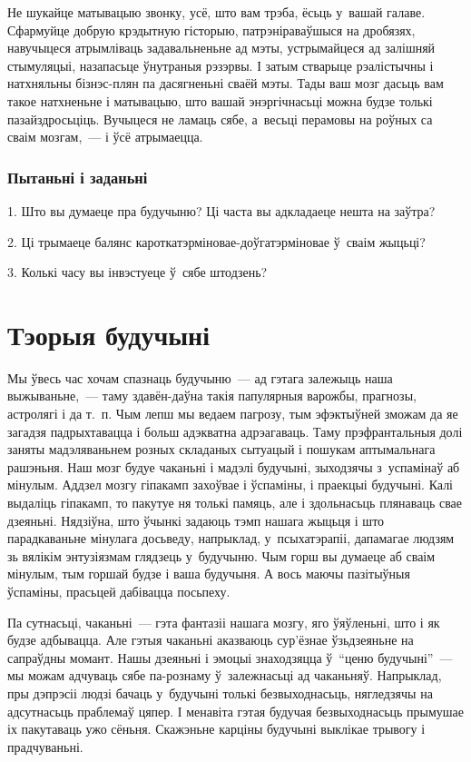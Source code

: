 Не шукайце матывацыю звонку, усё, што вам трэба, ёсьць у~вашай галаве. Сфармуйце добрую крэдытную гісторыю, патрэніраваўшыся на дробязях, навучыцеся атрымліваць задавальненьне ад мэты, устрымайцеся ад залішняй стымуляцыі, назапасьце ўнутраныя рэзэрвы. І затым стварыце рэалістычны і натхняльны бізнэс-плян па дасягненьні сваёй мэты. Тады ваш мозг дасьць вам такое натхненьне і матывацыю, што вашай энэргічнасьці можна будзе толькі пазайздросьціць. Вучыцеся не ламаць сябе, а~весьці перамовы на роўных са сваім мозгам,~--- і ўсё атрымаецца.

\subsubsection{Пытаньні і заданьні}

1. Што вы думаеце пра будучыню? Ці часта вы адкладаеце нешта на заўтра?

2. Ці трымаеце балянс кароткатэрміновае-доўгатэрміновае ў~сваім жыцьці?

3. Колькі часу вы інвэстуеце ў~сябе штодзень?


\section{Тэорыя будучыні}

Мы ўвесь час хочам спазнаць будучыню~--- ад гэтага залежыць наша выжываньне,~--- таму здавён-даўна такія папулярныя варожбы, прагнозы, астролягі і да т.~п. Чым лепш мы ведаем пагрозу, тым эфэктыўней зможам да яе загадзя падрыхтавацца і больш адэкватна адрэагаваць. Таму прэфрантальныя долі заняты мадэляваньнем розных складаных сытуацый і пошукам аптымальнага рашэньня. Наш мозг будуе чаканьні і мадэлі будучыні, зыходзячы з~успамінаў аб мінулым. Аддзел мозгу гіпакамп захоўвае і ўспаміны, і праекцыі будучыні. Калі выдаліць гіпакамп, то пакутуе ня толькі памяць, але і здольнасьць плянаваць свае дзеяньні. Нядзіўна, што ўчынкі задаюць тэмп нашага жыцьця і што парадкаваньне мінулага досьведу, напрыклад, у~псыхатэрапіі, дапамагае людзям зь вялікім энтузіязмам глядзець у~будучыню. Чым горш вы думаеце аб сваім мінулым, тым горшай будзе і ваша будучыня. А вось маючы пазітыўныя ўспаміны, прасьцей дабівацца посьпеху.

Па сутнасьці, чаканьні~--- гэта фантазіі нашага мозгу, яго ўяўленьні, што і як будзе адбывацца. Але гэтыя чаканьні аказваюць сур'ёзнае ўзьдзеяньне на сапраўдны момант. Нашы дзеяньні і эмоцыі знаходзяцца ў~``ценю будучыні''~--- мы можам адчуваць сябе па-рознаму ў~залежнасьці ад чаканьняў. Напрыклад, пры дэпрэсіі людзі бачаць у~будучыні толькі безвыходнасьць, нягледзячы на адсутнасьць праблемаў цяпер. І менавіта гэтая будучая безвыходнасьць прымушае іх пакутаваць ужо сёньня. Скажэньне карціны будучыні выклікае трывогу і прадчуваньні.

